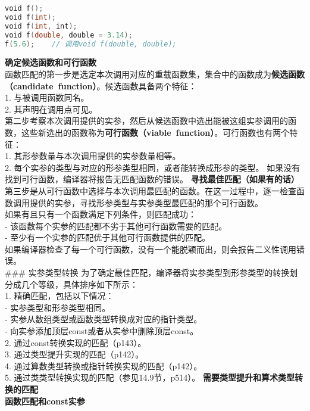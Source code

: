 \documentclass[
  a4paper,
  oneside,tablecaptionabove
]{scrbook}
\begin{document}
\begin{lstlisting}[language={C++}]
void f();
void f(int);
void f(int, int);
void f(double, double = 3.14);
f(5.6);    // 调用void f(double, double);
\end{lstlisting}

\textbf{确定候选函数和可行函数}\\
函数匹配的第一步是选定本次调用对应的重载函数集，集合中的函数成为\textbf{候选函数（candidate~function）}。候选函数具备两个特征：\\
1. 与被调用函数同名。\\
2. 其声明在调用点可见。\\
第二步考察本次调用提供的实参，然后从候选函数中选出能被这组实参调用的函数，这些新选出的函数称为\textbf{可行函数（viable~function）}。可行函数也有两个特征：\\
1. 其形参数量与本次调用提供的实参数量相等。\\
2. 每个实参的类型与对应的形参类型相同，或者能转换成形参的类型。
如果没有找到可行函数，编译器将报告无匹配函数的错误。
\textbf{寻找最佳匹配（如果有的话）}\\
第三步是从可行函数中选择与本次调用最匹配的函数。在这一过程中，逐一检查函数调用提供的实参，寻找形参类型与实参类型最匹配的那个可行函数。\\
如果有且只有一个函数满足下列条件，则匹配成功：\\
- 该函数每个实参的匹配都不劣于其他可行函数需要的匹配。\\
- 至少有一个实参的匹配优于其他可行函数提供的匹配。\\
如果编译器检查了每一个可行函数，没有一个能脱颖而出，则会报告二义性调用错误。\\
\#\#\# 实参类型转换
为了确定最佳匹配，编译器将实参类型到形参类型的转换划分成几个等级，具体排序如下所示：\\
1. 精确匹配，包括以下情况：\\
- 实参类型和形参类型相同。\\
- 实参从数组类型或函数类型转换成对应的指针类型。\\
- 向实参添加顶层const或者从实参中删除顶层const。\\
2. 通过const转换实现的匹配（p143）。\\
3. 通过类型提升实现的匹配（p142）。\\
4. 通过算数类型转换或指针转换实现的匹配（p142）。\\
5. 通过类类型转换实现的匹配（参见14.9节，p514）。
\textbf{需要类型提升和算术类型转换的匹配}\\
\textbf{函数匹配和const实参}
\end{document}
